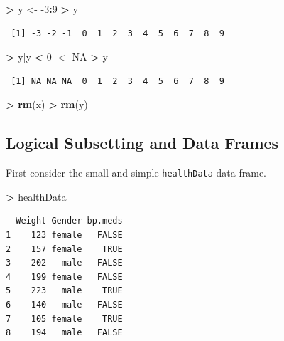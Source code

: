 \documentclass[
]{krantz}
\makeatletter
\newenvironment{Shaded}{\begin{snugshade}}{\end{snugshade}}
\newcommand{\DecValTok}[1]{\textcolor[rgb]{0.06,0.06,0.06}{#1}}
\newcommand{\KeywordTok}[1]{\textcolor[rgb]{0.27,0.27,0.27}{\textbf{#1}}}
\newcommand{\NormalTok}[1]{#1}
\newcommand{\OperatorTok}[1]{\textcolor[rgb]{0.43,0.43,0.43}{\textbf{#1}}}
\newcommand{\OtherTok}[1]{\textcolor[rgb]{0.37,0.37,0.37}{#1}}
\newcommand{\StringTok}[1]{\textcolor[rgb]{0.5,0.5,0.5}{#1}}
\newenvironment{kframe}{%
\medskip{}
\setlength{\fboxsep}{.8em}
 \def\at@end@of@kframe{}%
 \ifinner\ifhmode%
  \def\at@end@of@kframe{\end{minipage}}%
  \begin{minipage}{\columnwidth}%
 \fi\fi%
 \def\FrameCommand##1{\hskip\@totalleftmargin \hskip-\fboxsep
 \colorbox{shadecolor}{##1}\hskip-\fboxsep
     \hskip-\linewidth \hskip-\@totalleftmargin \hskip\columnwidth}%
 \MakeFramed {\advance\hsize-\width
   \@totalleftmargin\z@ \linewidth\hsize
   \@setminipage}}%
 {\par\unskip\endMakeFramed%
 \at@end@of@kframe}
\renewenvironment{Shaded}{\begin{kframe}}{\end{kframe}}
\makeatother
\begin{document}
\begin{Shaded}
\begin{Highlighting}[]
\OperatorTok{\textgreater{}}\StringTok{ }\NormalTok{y \textless{}{-}}\StringTok{ }\DecValTok{{-}3}\OperatorTok{:}\DecValTok{9}
\OperatorTok{\textgreater{}}\StringTok{ }\NormalTok{y}
\end{Highlighting}
\end{Shaded}

\begin{verbatim}
 [1] -3 -2 -1  0  1  2  3  4  5  6  7  8  9
\end{verbatim}

\begin{Shaded}
\begin{Highlighting}[]
\OperatorTok{\textgreater{}}\StringTok{ }\NormalTok{y[y }\OperatorTok{\textless{}}\StringTok{ }\DecValTok{0}\NormalTok{] \textless{}{-}}\StringTok{ }\OtherTok{NA}
\OperatorTok{\textgreater{}}\StringTok{ }\NormalTok{y}
\end{Highlighting}
\end{Shaded}

\begin{verbatim}
 [1] NA NA NA  0  1  2  3  4  5  6  7  8  9
\end{verbatim}

\begin{Shaded}
\begin{Highlighting}[]
\OperatorTok{\textgreater{}}\StringTok{ }\KeywordTok{rm}\NormalTok{(x)}
\OperatorTok{\textgreater{}}\StringTok{ }\KeywordTok{rm}\NormalTok{(y)}
\end{Highlighting}
\end{Shaded}

\hypertarget{logical-subsetting-and-data-frames}{%
\subsection{Logical Subsetting and Data Frames}\label{logical-subsetting-and-data-frames}}

First consider the small and simple \texttt{healthData} data frame.

\begin{Shaded}
\begin{Highlighting}[]
\OperatorTok{\textgreater{}}\StringTok{ }\NormalTok{healthData}
\end{Highlighting}
\end{Shaded}

\begin{verbatim}
  Weight Gender bp.meds
1    123 female   FALSE
2    157 female    TRUE
3    202   male   FALSE
4    199 female   FALSE
5    223   male    TRUE
6    140   male   FALSE
7    105 female    TRUE
8    194   male   FALSE
\end{verbatim}
\end{document}

